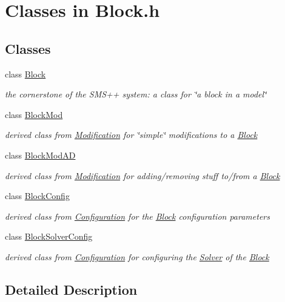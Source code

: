 \hypertarget{group___block___c_l_a_s_s_e_s}{}\section{Classes in Block.\+h}
\label{group___block___c_l_a_s_s_e_s}
\subsection*{Classes}
\begin{DoxyCompactItemize}
\item 
class \mbox{\hyperlink{class_s_m_spp__di__unipi__it_1_1_block}{Block}}
\begin{DoxyCompactList}\small\item\em the cornerstone of the S\+M\+S++ system\+: a class for \char`\"{}a block in a model\char`\"{} \end{DoxyCompactList}\item 
class \mbox{\hyperlink{class_s_m_spp__di__unipi__it_1_1_block_mod}{Block\+Mod}}
\begin{DoxyCompactList}\small\item\em derived class from \mbox{\hyperlink{class_s_m_spp__di__unipi__it_1_1_modification}{Modification}} for \char`\"{}simple\char`\"{} modifications to a \mbox{\hyperlink{class_s_m_spp__di__unipi__it_1_1_block}{Block}} \end{DoxyCompactList}\item 
class \mbox{\hyperlink{class_s_m_spp__di__unipi__it_1_1_block_mod_a_d}{Block\+Mod\+AD}}
\begin{DoxyCompactList}\small\item\em derived class from \mbox{\hyperlink{class_s_m_spp__di__unipi__it_1_1_modification}{Modification}} for adding/removing stuff to/from a \mbox{\hyperlink{class_s_m_spp__di__unipi__it_1_1_block}{Block}} \end{DoxyCompactList}\item 
class \mbox{\hyperlink{class_s_m_spp__di__unipi__it_1_1_block_config}{Block\+Config}}
\begin{DoxyCompactList}\small\item\em derived class from \mbox{\hyperlink{class_s_m_spp__di__unipi__it_1_1_configuration}{Configuration}} for the \mbox{\hyperlink{class_s_m_spp__di__unipi__it_1_1_block}{Block}} configuration parameters \end{DoxyCompactList}\item 
class \mbox{\hyperlink{class_s_m_spp__di__unipi__it_1_1_block_solver_config}{Block\+Solver\+Config}}
\begin{DoxyCompactList}\small\item\em derived class from \mbox{\hyperlink{class_s_m_spp__di__unipi__it_1_1_configuration}{Configuration}} for configuring the \mbox{\hyperlink{class_s_m_spp__di__unipi__it_1_1_solver}{Solver}} of the \mbox{\hyperlink{class_s_m_spp__di__unipi__it_1_1_block}{Block}} \end{DoxyCompactList}\end{DoxyCompactItemize}


\subsection{Detailed Description}
